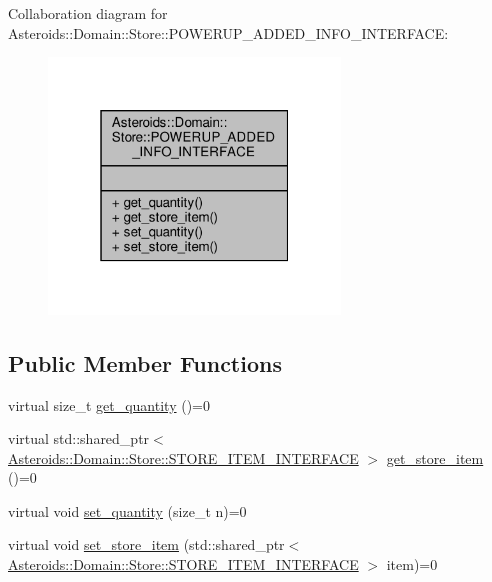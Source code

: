 Collaboration diagram for Asteroids\+:\+:Domain\+:\+:Store\+:\+:P\+O\+W\+E\+R\+U\+P\+\_\+\+A\+D\+D\+E\+D\+\_\+\+I\+N\+F\+O\+\_\+\+I\+N\+T\+E\+R\+F\+A\+CE\+:\nopagebreak
\begin{figure}[H]
\begin{center}
\leavevmode
\includegraphics[width=220pt]{classAsteroids_1_1Domain_1_1Store_1_1POWERUP__ADDED__INFO__INTERFACE__coll__graph}
\end{center}
\end{figure}
\subsection*{Public Member Functions}
\begin{DoxyCompactItemize}
\item 
virtual size\+\_\+t \hyperlink{classAsteroids_1_1Domain_1_1Store_1_1POWERUP__ADDED__INFO__INTERFACE_aa8b042d511f7d9551c25770234f5378e}{get\+\_\+quantity} ()=0
\item 
virtual std\+::shared\+\_\+ptr$<$ \hyperlink{classAsteroids_1_1Domain_1_1Store_1_1STORE__ITEM__INTERFACE}{Asteroids\+::\+Domain\+::\+Store\+::\+S\+T\+O\+R\+E\+\_\+\+I\+T\+E\+M\+\_\+\+I\+N\+T\+E\+R\+F\+A\+CE} $>$ \hyperlink{classAsteroids_1_1Domain_1_1Store_1_1POWERUP__ADDED__INFO__INTERFACE_a239e4ca18858270bde9a876e2690ca88}{get\+\_\+store\+\_\+item} ()=0
\item 
virtual void \hyperlink{classAsteroids_1_1Domain_1_1Store_1_1POWERUP__ADDED__INFO__INTERFACE_ae3d0100c74762789aa0250e32c51fb36}{set\+\_\+quantity} (size\+\_\+t n)=0
\item 
virtual void \hyperlink{classAsteroids_1_1Domain_1_1Store_1_1POWERUP__ADDED__INFO__INTERFACE_a16f5e557d71b54dc716863d619bd1549}{set\+\_\+store\+\_\+item} (std\+::shared\+\_\+ptr$<$ \hyperlink{classAsteroids_1_1Domain_1_1Store_1_1STORE__ITEM__INTERFACE}{Asteroids\+::\+Domain\+::\+Store\+::\+S\+T\+O\+R\+E\+\_\+\+I\+T\+E\+M\+\_\+\+I\+N\+T\+E\+R\+F\+A\+CE} $>$ item)=0
\end{DoxyCompactItemize}


